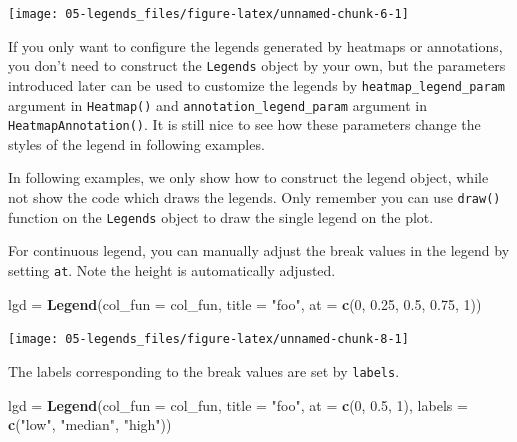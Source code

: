 \documentclass[]{book}
\newenvironment{Shaded}{\begin{snugshade}}{\end{snugshade}}
\newcommand{\KeywordTok}[1]{\textcolor[rgb]{0.13,0.29,0.53}{\textbf{#1}}}
\newcommand{\DataTypeTok}[1]{\textcolor[rgb]{0.13,0.29,0.53}{#1}}
\newcommand{\DecValTok}[1]{\textcolor[rgb]{0.00,0.00,0.81}{#1}}
\newcommand{\FloatTok}[1]{\textcolor[rgb]{0.00,0.00,0.81}{#1}}
\newcommand{\StringTok}[1]{\textcolor[rgb]{0.31,0.60,0.02}{#1}}
\newcommand{\NormalTok}[1]{#1}
\theoremstyle{definition}
\theoremstyle{definition}
\theoremstyle{definition}
\theoremstyle{remark}
\begin{document}
\begin{center}\texttt{[image: 05-legends\_files/figure-latex/unnamed-chunk-6-1]} \end{center}

If you only want to configure the legends generated by heatmaps or
annotations, you don't need to construct the \texttt{Legends} object by
your own, but the parameters introduced later can be used to customize
the legends by \texttt{heatmap\_legend\_param} argument in
\texttt{Heatmap()} and \texttt{annotation\_legend\_param} argument in
\texttt{HeatmapAnnotation()}. It is still nice to see how these
parameters change the styles of the legend in following examples.

In following examples, we only show how to construct the legend object,
while not show the code which draws the legends. Only remember you can
use \texttt{draw()} function on the \texttt{Legends} object to draw the
single legend on the plot.

For continuous legend, you can manually adjust the break values in the
legend by setting \texttt{at}. Note the height is automatically
adjusted.

\begin{Shaded}
\begin{Highlighting}[]
\NormalTok{lgd =}\StringTok{ }\KeywordTok{Legend}\NormalTok{(}\DataTypeTok{col_fun =}\NormalTok{ col_fun, }\DataTypeTok{title =} \StringTok{"foo"}\NormalTok{, }\DataTypeTok{at =} \KeywordTok{c}\NormalTok{(}\DecValTok{0}\NormalTok{, }\FloatTok{0.25}\NormalTok{, }\FloatTok{0.5}\NormalTok{, }\FloatTok{0.75}\NormalTok{, }\DecValTok{1}\NormalTok{))}
\end{Highlighting}
\end{Shaded}

\begin{center}\texttt{[image: 05-legends\_files/figure-latex/unnamed-chunk-8-1]} \end{center}

The labels corresponding to the break values are set by \texttt{labels}.

\begin{Shaded}
\begin{Highlighting}[]
\NormalTok{lgd =}\StringTok{ }\KeywordTok{Legend}\NormalTok{(}\DataTypeTok{col_fun =}\NormalTok{ col_fun, }\DataTypeTok{title =} \StringTok{"foo"}\NormalTok{, }\DataTypeTok{at =} \KeywordTok{c}\NormalTok{(}\DecValTok{0}\NormalTok{, }\FloatTok{0.5}\NormalTok{, }\DecValTok{1}\NormalTok{), }
    \DataTypeTok{labels =} \KeywordTok{c}\NormalTok{(}\StringTok{"low"}\NormalTok{, }\StringTok{"median"}\NormalTok{, }\StringTok{"high"}\NormalTok{))}
\end{Highlighting}
\end{Shaded}
\end{document}
